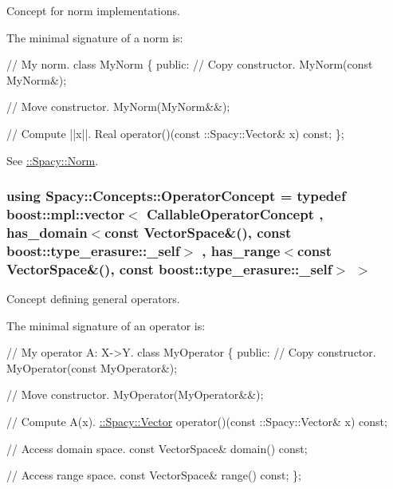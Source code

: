 Concept for norm implementations. 

\label{group__ConceptGroup_ga8b6032c46f6e31840a2c956c6360549b_NormConceptAnchor}%
\hypertarget{group__ConceptGroup_ga8b6032c46f6e31840a2c956c6360549b_NormConceptAnchor}{}%
The minimal signature of a norm is\+: 
\begin{DoxyCode}
\textcolor{comment}{// My norm.}
\textcolor{keyword}{class }MyNorm
\{
\textcolor{keyword}{public}:
  \textcolor{comment}{// Copy constructor.}
  MyNorm(\textcolor{keyword}{const} MyNorm&);

  \textcolor{comment}{// Move constructor.}
  MyNorm(MyNorm&&);

  \textcolor{comment}{// Compute ||x||.}
  Real operator()(const ::Spacy::Vector& x) \textcolor{keyword}{const};
\};
\end{DoxyCode}


See \hyperlink{group__SpacyGroup_gaf4f33b11d657c48566d961a013c92bd1_NormAnchor}{\+:\+:Spacy\+:\+:Norm}. \hypertarget{group__ConceptGroup_ga7d984281b647a6d8e4c0a7ea5faeb90e_ga7d984281b647a6d8e4c0a7ea5faeb90e}{}
\subsubsection[{Operator\+Concept}]{\setlength{\rightskip}{0pt plus 5cm}using {\bf Spacy\+::\+Concepts\+::\+Operator\+Concept} = typedef boost\+::mpl\+::vector$<$ Callable\+Operator\+Concept , has\+\_\+domain$<$const Vector\+Space\&(), const boost\+::type\+\_\+erasure\+::\+\_\+self$>$ , has\+\_\+range$<$const Vector\+Space\&(), const boost\+::type\+\_\+erasure\+::\+\_\+self$>$ $>$}\label{group__ConceptGroup_ga7d984281b647a6d8e4c0a7ea5faeb90e_ga7d984281b647a6d8e4c0a7ea5faeb90e}


Concept defining general operators. 

\label{group__ConceptGroup_ga7d984281b647a6d8e4c0a7ea5faeb90e_OperatorConceptAnchor}%
\hypertarget{group__ConceptGroup_ga7d984281b647a6d8e4c0a7ea5faeb90e_OperatorConceptAnchor}{}%
The minimal signature of an operator is\+: 
\begin{DoxyCode}
\textcolor{comment}{// My operator A: X->Y.}
\textcolor{keyword}{class }MyOperator
\{
\textcolor{keyword}{public}:
  \textcolor{comment}{// Copy constructor.}
  MyOperator(\textcolor{keyword}{const} MyOperator&);

  \textcolor{comment}{// Move constructor.}
  MyOperator(MyOperator&&);

  \textcolor{comment}{// Compute A(x).}
  \hyperlink{classSpacy_1_1Vector}{::Spacy::Vector} operator()(const ::Spacy::Vector& x) \textcolor{keyword}{const};

  \textcolor{comment}{// Access domain space.}
  \textcolor{keyword}{const} VectorSpace& domain() \textcolor{keyword}{const};

  \textcolor{comment}{// Access range space.}
  \textcolor{keyword}{const} VectorSpace& range() \textcolor{keyword}{const};
\};
\end{DoxyCode}


